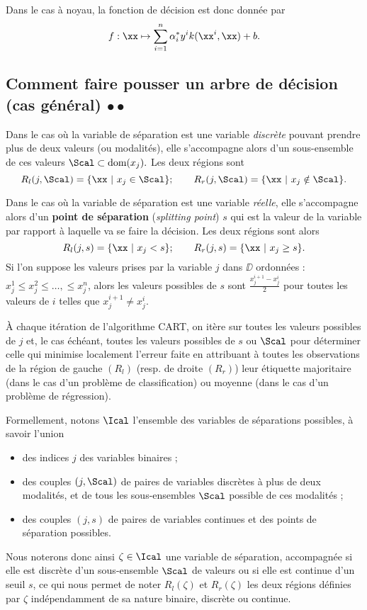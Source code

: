Dans le cas à noyau, la fonction de décision est donc donnée par 
\begin{equation*}
  f: \xx \mapsto \sum_{i=1}^n \alpha_i^* y^i k(\xx^i, \xx) + b.
\end{equation*}

\subsection{Comment faire pousser un arbre de décision (cas général) $\bullet \bullet$}
\label{sec:grow_tree}
Dans le cas où la variable de séparation est une variable {\it discrète}
pouvant prendre plus de deux valeurs (ou modalités), elle s'accompagne alors
d'un sous-ensemble de ces valeurs $\Scal \subset \text{dom}(x_j).$ Les deux
régions sont
\begin{equation*}
  R_l(j, \Scal) = \{\xx~|~x_j \in \Scal\} ; \hspace{2em} 
  R_r(j, \Scal) = \{\xx~|~x_j \notin  \Scal\}.
\end{equation*}

Dans le cas où la variable de séparation est une variable {\it réelle},
elle s'accompagne alors d'un \textbf{point de séparation} ({\it splitting
  point}) $s$ qui est la valeur de la variable par rapport à laquelle va se
faire la décision. Les deux régions sont alors
\begin{equation*}
  R_l(j, s) = \{\xx~|~x_j < s\} ; \hspace{2em} R_r(j, s) = \{\xx~|~x_j \geq s\}.
\end{equation*}
Si l'on suppose les valeurs prises par la variable $j$ dans $\DD$ ordonnées :
$x_j^1 \leq x_j^2 \leq \dots, \leq x_j^n$, alors les valeurs possibles de $s$
sont $\frac{x^{i+1}_j - x^i_j}2$ pour toutes les valeurs de $i$ telles que
$x^{i+1}_j \neq x^i_j.$


À chaque itération de l'algorithme CART, on itère sur toutes les valeurs
possibles de $j$ et, le cas échéant, toutes les valeurs possibles de $s$ ou
$\Scal$ pour déterminer celle qui minimise localement l'erreur faite en
attribuant à toutes les observations de la région de gauche $(R_l)$ (resp. de
droite $(R_r)$) leur étiquette majoritaire (dans le cas d'un problème de
classification) ou moyenne (dans le cas d'un problème de régression).


Formellement, notons $\Ical$ l'ensemble des variables de
séparations possibles, à savoir l'union
\begin{itemize}
\item des indices $j$ des variables binaires ;
\item des couples $(j, \Scal)$ de paires de variables discrètes à plus de deux
  modalités, et de tous les sous-ensembles $\Scal$ possible de ces modalités ;
\item des couples $(j, s)$ de paires de variables continues et des points de
  séparation possibles.
\end{itemize}
Nous noterons donc ainsi $\zeta \in \Ical$ une variable de séparation,
accompagnée si elle est discrète d'un sous-ensemble $\Scal$ de valeurs ou si
elle est continue d'un seuil $s$, ce qui nous permet de noter $R_l(\zeta)$ et
$R_r(\zeta)$ les deux régions définies par $\zeta$ indépendamment de sa nature
binaire, discrète ou continue.

